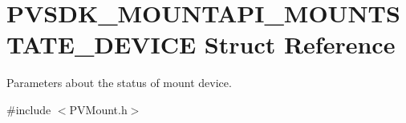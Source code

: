 \hypertarget{struct_p_v_s_d_k___m_o_u_n_t_a_p_i___m_o_u_n_t_s_t_a_t_e___d_e_v_i_c_e}{}\section{P\+V\+S\+D\+K\+\_\+\+M\+O\+U\+N\+T\+A\+P\+I\+\_\+\+M\+O\+U\+N\+T\+S\+T\+A\+T\+E\+\_\+\+D\+E\+V\+I\+CE Struct Reference}
\label{struct_p_v_s_d_k___m_o_u_n_t_a_p_i___m_o_u_n_t_s_t_a_t_e___d_e_v_i_c_e}


Parameters about the status of mount device.  




{\ttfamily \#include $<$P\+V\+Mount.\+h$>$}

